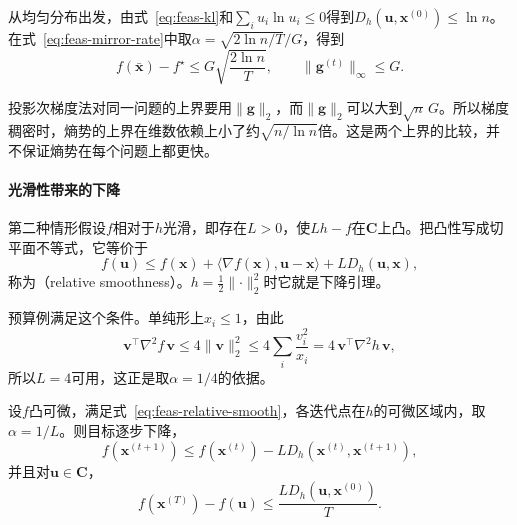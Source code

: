 从均匀分布出发，由式~\eqref{eq:feas-kl}和$\sum_iu_i\ln u_i\leq0$得到$D_h(\bm{u},\bm{x}^{(0)})\leq\ln n$。在式~\eqref{eq:feas-mirror-rate}中取$\alpha=\sqrt{2\ln n/T}/G$，得到
\begin{equation}
 f(\bar{\bm{x}})-f^\star\leq G\sqrt{\frac{2\ln n}{T}},\qquad\lVert\bm{g}^{(t)}\rVert_\infty\leq G.
 \label{eq:feas-entropy-rate}
\end{equation}

投影次梯度法对同一问题的上界要用$\lVert\bm{g}\rVert_2$，而$\lVert\bm{g}\rVert_2$可以大到$\sqrt{n}\,G$。所以梯度稠密时，熵势的上界在维数依赖上小了约$\sqrt{n/\ln n}$倍。这是两个上界的比较，并不保证熵势在每个问题上都更快。

\paragraph{光滑性带来的下降}
第二种情形假设$f$相对于$h$光滑，即存在$L>0$，使$Lh-f$在$\bm{C}$上凸。把凸性写成切平面不等式，它等价于
\begin{equation}
 f(\bm{u})\leq f(\bm{x})+\langle\nabla f(\bm{x}),\bm{u}-\bm{x}\rangle+LD_h(\bm{u},\bm{x}),
 \label{eq:feas-relative-smooth}
\end{equation}
称为（relative smoothness）。$h=\tfrac12\lVert\cdot\rVert_2^2$时它就是下降引理。

预算例满足这个条件。单纯形上$x_i\leq1$，由此
\[
 \bm{v}^\top\nabla^2f\,\bm{v}\leq4\lVert\bm{v}\rVert_2^2\leq4\sum_i\frac{v_i^2}{x_i}=4\,\bm{v}^\top\nabla^2h\,\bm{v},
\]
所以$L=4$可用，这正是取$\alpha=1/4$的依据。

\begin{theorem}[相对光滑下的镜像下降]
\label{thm:feas-mirror-smooth}
设$f$凸可微，满足式~\eqref{eq:feas-relative-smooth}，各迭代点在$h$的可微区域内，取$\alpha=1/L$。则目标逐步下降，
\begin{equation}
 f(\bm{x}^{(t+1)})\leq f(\bm{x}^{(t)})-LD_h(\bm{x}^{(t)},\bm{x}^{(t+1)}),
 \label{eq:feas-mirror-descent}
\end{equation}
并且对$\bm{u}\in\bm{C}$，
\begin{equation}
 f(\bm{x}^{(T)})-f(\bm{u})\leq\frac{LD_h(\bm{u},\bm{x}^{(0)})}{T}.
 \label{eq:feas-mirror-smooth-rate}
\end{equation}
\end{theorem}

